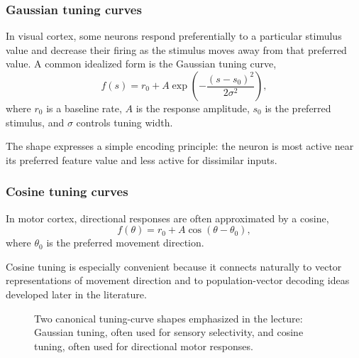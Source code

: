 \documentclass[11pt]{article}
\begin{document}
\subsubsection{Gaussian tuning curves}

In visual cortex, some neurons respond preferentially to a particular stimulus value and decrease their firing as the stimulus moves away from that preferred value. A common idealized form is the Gaussian tuning curve,
\[
f(s)=r_0 + A\exp\!\left(-\frac{(s-s_0)^2}{2\sigma^2}\right),
\]
where $r_0$ is a baseline rate, $A$ is the response amplitude, $s_0$ is the preferred stimulus, and $\sigma$ controls tuning width.

The shape expresses a simple encoding principle: the neuron is most active near its preferred feature value and less active for dissimilar inputs.

\subsubsection{Cosine tuning curves}

In motor cortex, directional responses are often approximated by a cosine,
\[
f(\theta)=r_0 + A\cos(\theta-\theta_0),
\]
where $\theta_0$ is the preferred movement direction.

Cosine tuning is especially convenient because it connects naturally to vector representations of movement direction and to population-vector decoding ideas developed later in the literature.

\begin{figure}[h]
\centering
{}
\caption{Two canonical tuning-curve shapes emphasized in the lecture: Gaussian tuning, often used for sensory selectivity, and cosine tuning, often used for directional motor responses.}
\end{figure}
\end{document}
